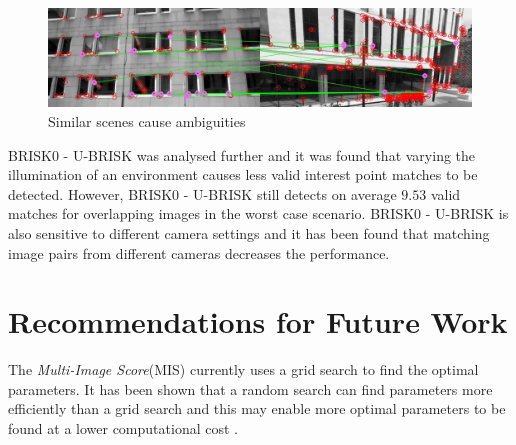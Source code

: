 \documentclass[11pt]{report}
\begin{document}
\begin{figure}
  \centering
    \includegraphics[width=1.0\textwidth]{../Drawings/Matching/dataset_similar_scene.jpg}
    \caption{Similar scenes cause ambiguities} 
    \label{fig:similarScene}
\end{figure}


BRISK0 - U-BRISK was analysed further and it was found that varying the illumination of an environment causes less valid interest point matches to be detected. However, BRISK0 - U-BRISK still detects on average $9.53$ valid matches for overlapping images in the worst case scenario. BRISK0 - U-BRISK is also sensitive to different camera settings and it has been found that matching image pairs from different cameras decreases the performance.\\






\section{Recommendations for Future Work}
\label{sec:recommend}
The \textit{Multi-Image Score}(MIS) currently uses a grid search to find the optimal parameters. It has been shown that a random search can find parameters more efficiently than a grid search and this may enable more optimal parameters to be found at a lower computational cost \cite{Bergstra2012}.\\
\end{document}
